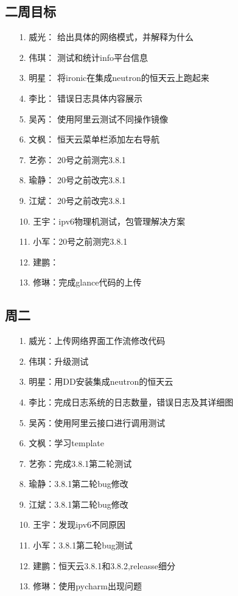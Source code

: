 \documentclass[a4paper,left=1.5cm,right=1.5cm,11pt]{article}
\begin{document}
\subsection{二周目标}
	\begin{itemize}
        \item[1.]威光： 给出具体的网络模式，并解释为什么
		\item[2.]伟琪： 测试和统计info平台信息
		\item[3.]明星： 将ironic在集成neutron的恒天云上跑起来
		\item[4.]李比： 错误日志具体内容展示
		\item[5.]吴芮： 使用阿里云测试不同操作镜像
		\item[6.]文枫： 恒天云菜单栏添加左右导航
		\item[7.]艺弥： 20号之前测完3.8.1
		\item[8.]瑜静： 20号之前改完3.8.1
		\item[9.]江斌： 20号之前改完3.8.1
		\item[10.]王宇：ipv6物理机测试，包管理解决方案
		\item[11.]小军：20号之前测完3.8.1
		\item[12.]建鹏：
		\item[13.]修琳：完成glance代码的上传
    \end{itemize}
\subsection{周二}
    \begin{itemize}
       \item[1.]威光：上传网络界面工作流修改代码
		\item[2.]伟琪：升级测试
		\item[3.]明星：用DD安装集成neutron的恒天云
		\item[4.]李比：完成日志系统的日志数量，错误日志及其详细图
		\item[5.]吴芮：使用阿里云接口进行调用测试
		\item[6.]文枫：学习template
		\item[7.]艺弥：完成3.8.1第二轮测试
		\item[8.]瑜静：3.8.1第二轮bug修改
		\item[9.]江斌：3.8.1第二轮bug修改
		\item[10.]王宇：发现ipv6不同原因
		\item[11.]小军：3.8.1第二轮bug测试
		\item[12.]建鹏：恒天云3.8.1和3.8.2,releasse细分
		\item[13.]修琳：使用pycharm出现问题
    \end{itemize}
\end{document}
